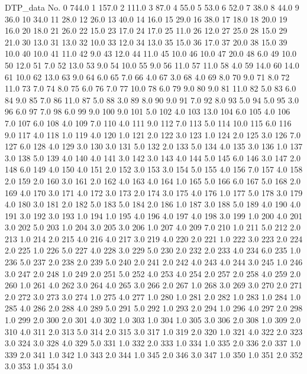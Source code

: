 DTP_data	No.
0	744.0
1	157.0
2	111.0
3	87.0
4	55.0
5	53.0
6	52.0
7	38.0
8	44.0
9	36.0
10	34.0
11	28.0
12	26.0
13	40.0
14	16.0
15	29.0
16	38.0
17	18.0
18	20.0
19	16.0
20	18.0
21	26.0
22	15.0
23	17.0
24	17.0
25	11.0
26	12.0
27	25.0
28	15.0
29	21.0
30	13.0
31	13.0
32	10.0
33	12.0
34	13.0
35	15.0
36	17.0
37	20.0
38	15.0
39	10.0
40	10.0
41	11.0
42	9.0
43	12.0
44	11.0
45	10.0
46	10.0
47	20.0
48	6.0
49	10.0
50	12.0
51	7.0
52	13.0
53	9.0
54	10.0
55	9.0
56	11.0
57	11.0
58	4.0
59	14.0
60	14.0
61	10.0
62	13.0
63	9.0
64	6.0
65	7.0
66	4.0
67	3.0
68	4.0
69	8.0
70	9.0
71	8.0
72	11.0
73	7.0
74	8.0
75	6.0
76	7.0
77	10.0
78	6.0
79	9.0
80	9.0
81	11.0
82	5.0
83	6.0
84	9.0
85	7.0
86	11.0
87	5.0
88	3.0
89	8.0
90	9.0
91	7.0
92	8.0
93	5.0
94	5.0
95	3.0
96	6.0
97	7.0
98	6.0
99	9.0
100	9.0
101	5.0
102	4.0
103	13.0
104	6.0
105	4.0
106	7.0
107	6.0
108	4.0
109	7.0
110	4.0
111	9.0
112	7.0
113	5.0
114	10.0
115	6.0
116	9.0
117	4.0
118	1.0
119	4.0
120	1.0
121	2.0
122	3.0
123	1.0
124	2.0
125	3.0
126	7.0
127	6.0
128	4.0
129	3.0
130	3.0
131	5.0
132	2.0
133	5.0
134	4.0
135	3.0
136	1.0
137	3.0
138	5.0
139	4.0
140	4.0
141	3.0
142	3.0
143	4.0
144	5.0
145	6.0
146	3.0
147	2.0
148	6.0
149	4.0
150	4.0
151	2.0
152	3.0
153	3.0
154	5.0
155	4.0
156	7.0
157	4.0
158	2.0
159	2.0
160	3.0
161	2.0
162	4.0
163	4.0
164	1.0
165	5.0
166	6.0
167	5.0
168	2.0
169	4.0
170	3.0
171	4.0
172	3.0
173	2.0
174	3.0
175	4.0
176	1.0
177	5.0
178	3.0
179	4.0
180	3.0
181	2.0
182	5.0
183	5.0
184	2.0
186	1.0
187	3.0
188	5.0
189	4.0
190	4.0
191	3.0
192	3.0
193	1.0
194	1.0
195	4.0
196	4.0
197	4.0
198	3.0
199	1.0
200	4.0
201	3.0
202	5.0
203	1.0
204	3.0
205	3.0
206	1.0
207	4.0
209	7.0
210	1.0
211	5.0
212	2.0
213	1.0
214	2.0
215	4.0
216	4.0
217	3.0
219	4.0
220	2.0
221	1.0
222	3.0
223	2.0
224	2.0
225	1.0
226	5.0
227	4.0
228	3.0
229	5.0
230	2.0
232	2.0
233	4.0
234	6.0
235	1.0
236	5.0
237	2.0
238	2.0
239	5.0
240	2.0
241	2.0
242	4.0
243	4.0
244	3.0
245	1.0
246	3.0
247	2.0
248	1.0
249	2.0
251	5.0
252	4.0
253	4.0
254	2.0
257	2.0
258	4.0
259	2.0
260	1.0
261	4.0
262	3.0
264	4.0
265	3.0
266	2.0
267	1.0
268	3.0
269	3.0
270	2.0
271	2.0
272	3.0
273	3.0
274	1.0
275	4.0
277	1.0
280	1.0
281	2.0
282	1.0
283	1.0
284	1.0
285	4.0
286	2.0
288	4.0
289	5.0
291	5.0
292	1.0
293	2.0
294	1.0
296	4.0
297	2.0
298	1.0
299	2.0
300	2.0
301	4.0
302	1.0
303	1.0
304	1.0
305	3.0
306	2.0
308	1.0
309	2.0
310	4.0
311	2.0
313	5.0
314	2.0
315	3.0
317	1.0
319	2.0
320	1.0
321	4.0
322	2.0
323	3.0
324	3.0
328	4.0
329	5.0
331	1.0
332	2.0
333	1.0
334	1.0
335	2.0
336	2.0
337	1.0
339	2.0
341	1.0
342	1.0
343	2.0
344	1.0
345	2.0
346	3.0
347	1.0
350	1.0
351	2.0
352	3.0
353	1.0
354	3.0
